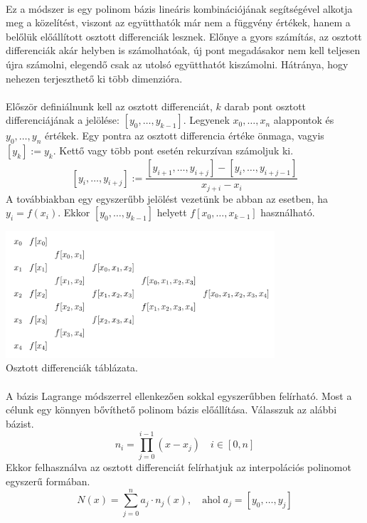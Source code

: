 \documentclass{elteikthesis}
\begin{document}
\paragraph{}
Ez a módszer is egy polinom bázis lineáris kombinációjának segítségével alkotja meg a közelítést, viszont az együtthatók már nem a függvény értékek, hanem a belőlük előállított osztott differenciák lesznek. Előnye a gyors számítás, az osztott differenciák akár helyben is számolhatóak, új pont megadásakor nem kell teljesen újra számolni, elegendő csak az utolsó együtthatót kiszámolni. Hátránya, hogy nehezen terjeszthető ki több dimenzióra.
\paragraph{}
Először definiálnunk kell az osztott differenciát, $k$ darab pont osztott differenciájának a jelölése: $[y_0, \dots, y_{k-1}]$. Legyenek $x_0, \dots, x_n$ alappontok és $y_0, \dots, y_n$ értékek. Egy pontra az osztott differencia értéke önmaga, vagyis $[y_k] := y_k$. Kettő vagy több pont esetén rekurzívan számoljuk ki.
$$[y_i, \dots, y_{i+j}] := \frac{[y_{i+1}, \dots, y_{i+j}] - [y_{i}, \dots, y_{i+j-1}]}{x_{j+i} - x_i}$$
A továbbiakban egy egyszerűbb jelölést vezetünk be abban az esetben, ha $y_i = f(x_i)$. Ekkor $[y_0, \dots, y_{k-1}]$ helyett $f[x_0, \dots, x_{k-1}]$ használható.
\begin{center}
\includegraphics[width=10cm]{pics/divide_difference_table}\\
{\footnotesize Osztott differenciák táblázata.}
\end{center}
\paragraph{}
A bázis Lagrange módszerrel ellenkezően sokkal egyszerűbben felírható. Most a célunk egy könnyen bővíthető polinom bázis előállítása. Válasszuk az alábbi bázist. $$n_i = \prod_{j = 0}^{i-1}(x-x_j) \quad i \in [0, n]$$
Ekkor felhasználva az osztott differenciát felírhatjuk az interpolációs polinomot egyszerű formában.
$$N(x) = \sum_{j=0}^{n}a_j \cdot n_j(x), \quad \mbox{ahol} \; a_j = [y_0, \dots ,y_j]$$
\end{document}
